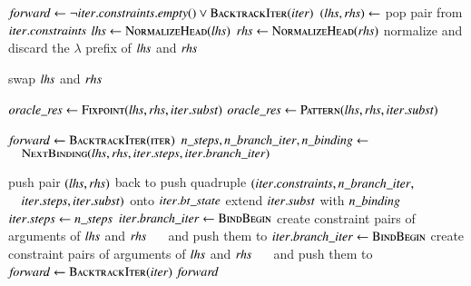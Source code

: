 \vspace{\jot}
\begin{algorithmic}[]
  \State $\mathit{forward} \gets \neg \mathit{iter.constraints.empty()} \lor \textsc{BacktrackIter}(\mathit{iter})$
    \State $(\mathit{lhs}, \mathit{rhs}) \gets $ pop pair from $\mathit{iter.constraints}$
    \State $\mathit{lhs} \gets \textsc{NormalizeHead}(\mathit{lhs})$
    \State $\mathit{rhs} \gets \textsc{NormalizeHead}(\mathit{rhs})$
    \State normalize and discard the $\lambda$ prefix of $\mathit{lhs}$ and $\mathit{rhs}$

      \State swap $\mathit{lhs}$ and $\mathit{rhs}$
    \EndIf

      \State $\mathit{oracle\_res} \gets \textsc{Fixpoint}(\mathit{lhs, rhs, iter.subst}) $
        \State $\mathit{oracle\_res} \gets \textsc{Pattern}(\mathit{lhs, rhs, iter.subst}) $
      \EndIf

        \State $\mathit{forward} \gets \textsc{BacktrackIter(iter)}$
        \State $\mathit{n\_steps}, \mathit{n\_branch\_iter}, \mathit{n\_binding} \gets$
        \State $\quad \textsc{NextBinding}(\mathit{lhs}, \mathit{rhs}, \mathit{iter.steps}, \mathit{iter.branch\_iter})$
        
          \State push pair $(\mathit{lhs},\mathit{rhs})$ back to 
          \State push quadruple $(\mathit{iter.constraints}, \mathit{n\_branch\_iter}, $
          \State                  $\quad \mathit{iter.steps}, \mathit{iter.subst})$ onto $\mathit{iter.bt\_state}$
          \State extend $\mathit{iter.subst}$ with $\mathit{n\_binding}$
          \State $\mathit{iter.steps} \gets \mathit{n\_steps}$
          \State $\mathit{iter.branch\_iter} \gets \textsc{BindBegin}$
          \State create constraint pairs of arguments of $\mathit{lhs}$ and $\mathit{rhs}$
          \State $\quad$ and push them to 
          \State $\mathit{iter.branch\_iter} \gets \textsc{BindBegin}$
        \EndIf
      \EndIf
      \State create constraint pairs of arguments of $\mathit{lhs}$ and $\mathit{rhs}$
      \State $\quad$ and push them to 
    \Else{} \State $\mathit{forward} \gets \textsc{BacktrackIter(\ensuremath{\mathit{iter}})}$
    \EndIf
  \EndWhile
  \State \Return $\mathit{forward}$
  \EndFunction
  

\end{algorithmic}
